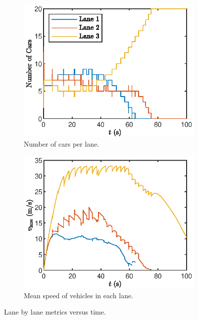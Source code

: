 \documentclass[12pt]{article}
\begin{document}
    \begin{figure}[H]
      \centering
    \begin{subfigure}[H]{.49\textwidth}
      \includegraphics[width=\linewidth]{mlbn_lanecars.eps}
      \centering
      \caption{Number of cars per lane.}
    \end{subfigure}
    \begin{subfigure}[H]{.49\textwidth}
      \includegraphics[width=\linewidth]{mlbn_laneSpeed.eps}
      \centering
      \caption{Mean speed of vehicles in each lane.}
    \end{subfigure}
    \caption{Lane by lane metrics versus time.}
    \label{fig:mean lane speed}
    \label{fig:num cars per lane}
  \end{figure}
\end{document}
